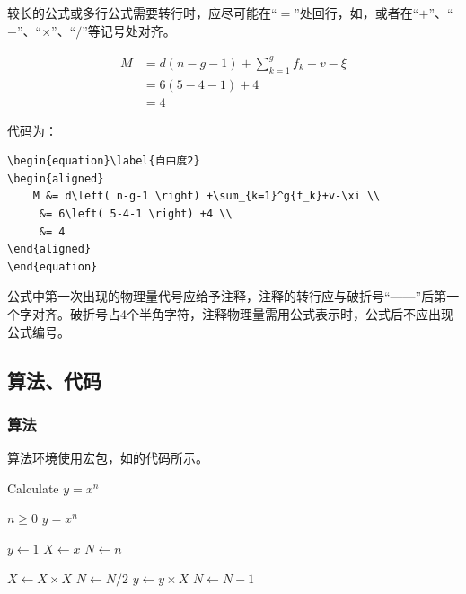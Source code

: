 较长的公式或多行公式需要转行时，应尽可能在“$=$”处回行，如，或者在“$+$”、“$-$”、“$\times$”、“$/$”等记号处对齐。

\begin{equation}\label{自由度2}
\begin{aligned}
    M &= d\left( n-g-1 \right) +\sum_{k=1}^g{f_k}+v-\xi \\
     &= 6\left( 5-4-1 \right) +4\\
     &= 4
\end{aligned}
\end{equation}

代码为：

\begin{lstlisting}[language={[LaTeX]TeX}]
\begin{equation}\label{自由度2}
\begin{aligned}
    M &= d\left( n-g-1 \right) +\sum_{k=1}^g{f_k}+v-\xi \\
     &= 6\left( 5-4-1 \right) +4 \\
     &= 4
\end{aligned}
\end{equation}
\end{lstlisting}

公式中第一次出现的物理量代号应给予注释，注释的转行应与破折号“——”后第一个字对齐。破折号占4个半角字符，注释物理量需用公式表示时，公式后不应出现公式编号。

\subsection{算法、代码}

\subsubsection{算法}

算法环境使用宏包，如的代码所示。

\begin{algorithm}
  \caption{Calculate $y = x^n$}
  \label{alg1}
  \small
  \begin{algorithmic}
    \REQUIRE $n \geq 0$
    \ENSURE $y = x^n$

    \STATE $y \leftarrow 1$
    \STATE $X \leftarrow x$
    \STATE $N \leftarrow n$

        \STATE $X \leftarrow X \times X$
        \STATE $N \leftarrow N / 2$
      \ELSE[$N$ is odd]
        \STATE $y \leftarrow y \times X$
        \STATE $N \leftarrow N - 1$
      \ENDIF
    \ENDWHILE
  \end{algorithmic}
\end{algorithm}

